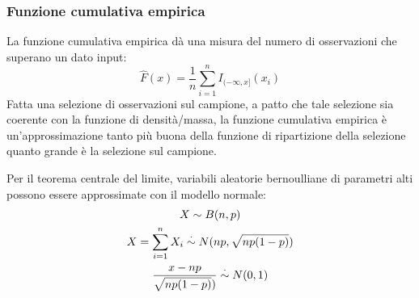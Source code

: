 \subsubsection{Funzione cumulativa empirica}
La funzione cumulativa empirica dà una misura del numero di osservazioni che superano un dato input:
\begin{equation*}
	\hat F(x) = \frac{1}{n} \sum_{i=1}^n I_{(-\infty,x]}(x_i)
\end{equation*}
Fatta una selezione di osservazioni sul campione, a patto che tale selezione sia coerente con la funzione di densità/massa, la funzione cumulativa empirica è un'approssimazione tanto più buona della funzione di ripartizione della selezione quanto grande è la selezione sul campione.

Per il teorema centrale del limite, variabili aleatorie bernoulliane di parametri alti possono essere approssimate con il modello normale:
\begin{gather*}
	X\sim B(n,p) \\
	X = \sum_{i=1}^n X_i \overset{\cdot}{\sim} N(np, \sqrt{np(1-p)}) \\
	\frac{x-np}{\sqrt{np(1-p)})} \overset{\cdot}{\sim} N(0,1)
\end{gather*}
